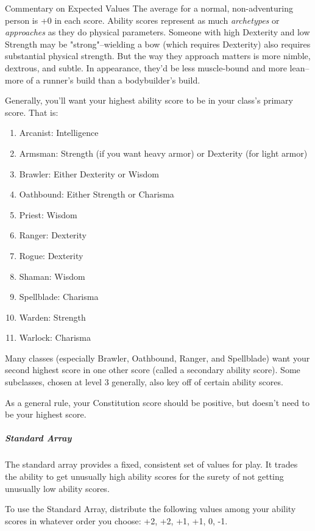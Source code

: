 \begin{DndComment}{Commentary on Expected Values}
	The average for a normal, non-adventuring person is +0 in each score. Ability scores represent as much \textit{archetypes} or \textit{approaches} as they do physical parameters. Someone with high Dexterity and low Strength may be "strong"--wielding a bow (which requires Dexterity) also requires substantial physical strength. But the way they approach matters is more nimble, dextrous, and subtle. In appearance, they'd be less muscle-bound and more lean--more of a runner's build than a bodybuilder's build.

	Generally, you'll want your highest ability score to be in your class's primary score. That is:
	\begin{enumerate}
		\item Arcanist: Intelligence
		\item Armsman: Strength (if you want heavy armor) or Dexterity (for light armor)
		\item Brawler: Either Dexterity or Wisdom
		\item Oathbound: Either Strength or Charisma
		\item Priest: Wisdom
		\item Ranger: Dexterity
		\item Rogue: Dexterity
		\item Shaman: Wisdom
		\item Spellblade: Charisma
		\item Warden: Strength
		\item Warlock: Charisma
	\end{enumerate}

	Many classes (especially Brawler, Oathbound, Ranger, and Spellblade) want your second highest score in one other score (called a secondary ability score). Some subclasses, chosen at level 3 generally, also key off of certain ability scores.

	As a general rule, your Constitution score should be positive, but doesn't need to be your highest score.
\end{DndComment}

\subparagraph*{Standard Array}
The standard array provides a fixed, consistent set of values for play. It trades the ability to get unusually high ability scores for the surety of not getting unusually low ability scores.

To use the Standard Array, distribute the following values among your ability scores in whatever order you choose: +2, +2, +1, +1, 0, -1.

